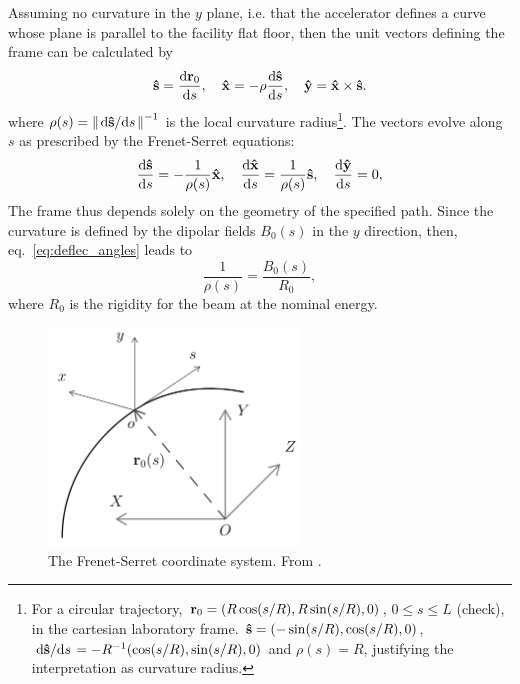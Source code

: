 Assuming no curvature in the $y$ plane, i.e. that the accelerator defines a curve whose plane is parallel to the facility flat floor, then the unit vectors defining the frame can be calculated by\cite{lee_accelerator_2004}
\begin{equation}
\vu{s}=\dv{\vb{r}_{0}}{s}, \quad \vu{x}=-\rho\dv{\vu{s}}{s}, \quad \vu{y} =  \vu{x}\times\vu{s}.
\end{equation}
where $\rho(s) = \norm{\dv*{\vu{s}}{s}}^{-1}$ is the local curvature radius\footnote{For a circular trajectory, $\vb{r}_0 = (R\cos(s/R), R\sin(s/R), 0)$, $ 0\leq s \leq L$ (check), in the cartesian laboratory frame. $\vu{s}=(-\sin(s/R), \cos(s/R), 0)$, $\dv*{\vu{s}}{s} = -R^{-1}(\cos(s/R),\sin(s/R), 0 )$ and $\rho(s)=R$, justifying the interpretation as curvature radius.}. The vectors evolve along $s$ as prescribed by the Frenet-Serret equations:
\begin{equation}
\dv{\vu{s}}{s}=-\frac{1}{\rho(s)}\vu{x}, \quad\dv{\vu{x}}{s}=\frac{1}{\rho(s)}\vu{s}, \quad \dv{\vu{y}}{s}=0,
\end{equation}
The frame thus depends solely on the geometry of the specified path. Since the curvature is defined by the dipolar fields $B_0(s)$ in the $y$ direction, then, eq.~\eqref{eq:deflec_angles} leads to
    \begin{equation}
        \frac{1}{\rho(s)} = \frac{B_0(s)}{R_0},
        \label{eq:G}
    \end{equation}
where $R_0$ is the rigidity for the beam at the nominal energy.
\begin{figure}[htb]
    \centering
    \includegraphics[width=0.6\textwidth]{Images/frenetserret.png}
    \caption{The Frenet-Serret coordinate system. From \cite{huang_beam-based_2019}.}
    \label{fig:frenet-serret}
\end{figure}

